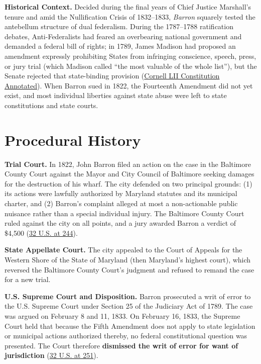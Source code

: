 \documentclass[12pt]{article}
\begin{document}
\textbf{Historical Context.} Decided during the final years of Chief Justice Marshall's tenure and amid the Nullification Crisis of 1832--1833, \textit{Barron} squarely tested the antebellum structure of dual federalism. During the 1787--1788 ratification debates, Anti-Federalists had feared an overbearing national government and demanded a federal bill of rights; in 1789, James Madison had proposed an amendment expressly prohibiting States from infringing conscience, speech, press, or jury trial (which Madison called ``the most valuable of the whole list''), but the Senate rejected that state-binding provision (\href{https://www.law.cornell.edu/constitution-conan/amendment-14/overview-of-incorporation-of-the-bill-of-rights}{Cornell LII Constitution Annotated}). When Barron sued in 1822, the Fourteenth Amendment did not yet exist, and most individual liberties against state abuse were left to state constitutions and state courts.

\section{Procedural History}

\textbf{Trial Court.} In 1822, John Barron filed an action on the case in the Baltimore County Court against the Mayor and City Council of Baltimore seeking damages for the destruction of his wharf. The city defended on two principal grounds: (1) its actions were lawfully authorized by Maryland statutes and its municipal charter, and (2) Barron's complaint alleged at most a non-actionable public nuisance rather than a special individual injury. The Baltimore County Court ruled against the city on all points, and a jury awarded Barron a verdict of \$4,500 (\href{https://supreme.justia.com/cases/federal/us/32/243/}{32 U.S. at 244}).

\textbf{State Appellate Court.} The city appealed to the Court of Appeals for the Western Shore of the State of Maryland (then Maryland's highest court), which reversed the Baltimore County Court's judgment and refused to remand the case for a new trial.

\textbf{U.S. Supreme Court and Disposition.} Barron prosecuted a writ of error to the U.S. Supreme Court under Section 25 of the Judiciary Act of 1789. The case was argued on February 8 and 11, 1833. On February 16, 1833, the Supreme Court held that because the Fifth Amendment does not apply to state legislation or municipal actions authorized thereby, no federal constitutional question was presented. The Court therefore \textbf{dismissed the writ of error for want of jurisdiction} (\href{https://supreme.justia.com/cases/federal/us/32/243/}{32 U.S. at 251}).
\end{document}
